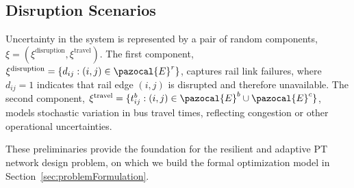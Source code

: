 \documentclass[3p,times,procedia]{elsarticle}
\begin{document}
\subsection{Disruption Scenarios}
Uncertainty in the system is represented by a pair of random components, $\xi = (\xi^{\text{disruption}}, \xi^{\text{travel}})$.  
The first component, $\xi^{\text{disruption}} = \{d_{ij} : (i,j) \in \pazocal{E}^r\}$, captures rail link failures, where $d_{ij}=1$ indicates that rail edge $(i,j)$ is disrupted and therefore unavailable. %
The second component, $\xi^{\text{travel}} = \{t_{ij}^b : (i,j) \in \pazocal{E}^b \cup \pazocal{E}^c\}$, models stochastic variation in bus travel times, reflecting congestion or other operational uncertainties.  

These preliminaries provide the foundation for the resilient and adaptive PT network design problem, on which we build the formal optimization model in Section~\ref{sec:problemFormulation}.
\end{document}
